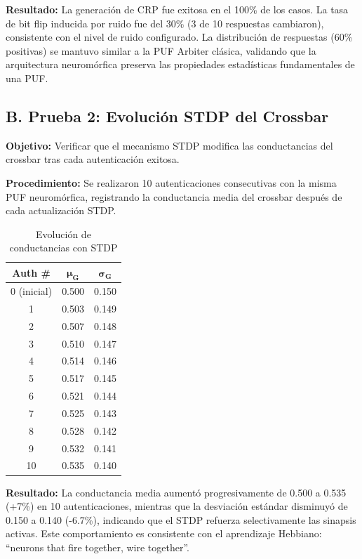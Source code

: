 \textbf{Resultado:} La generación de CRP fue exitosa en el 100\% de los casos. La tasa de bit flip inducida por ruido fue del 30\% (3 de 10 respuestas cambiaron), consistente con el nivel de ruido configurado. La distribución de respuestas (60\% positivas) se mantuvo similar a la PUF Arbiter clásica, validando que la arquitectura neuromórfica preserva las propiedades estadísticas fundamentales de una PUF.

\subsection*{B. Prueba 2: Evolución STDP del Crossbar}

\textbf{Objetivo:} Verificar que el mecanismo STDP modifica las conductancias del crossbar tras cada autenticación exitosa.

\textbf{Procedimiento:} Se realizaron 10 autenticaciones consecutivas con la misma PUF neuromórfica, registrando la conductancia media del crossbar después de cada actualización STDP.

\begin{table}[H]
    \centering\footnotesize\setlength{\tabcolsep}{4pt}
    \caption{Evolución de conductancias con STDP}
    \label{tab:stdp-evol}
    \begin{tabular}{|c|c|c|}
        \hline
        \textbf{Auth \#} & $\mathbf{\mu_G}$ & $\mathbf{\sigma_G}$ \\
        \hline
        0 (inicial) & 0.500 & 0.150 \\
        1 & 0.503 & 0.149 \\
        2 & 0.507 & 0.148 \\
        3 & 0.510 & 0.147 \\
        4 & 0.514 & 0.146 \\
        5 & 0.517 & 0.145 \\
        6 & 0.521 & 0.144 \\
        7 & 0.525 & 0.143 \\
        8 & 0.528 & 0.142 \\
        9 & 0.532 & 0.141 \\
        10 & 0.535 & 0.140 \\
        \hline
    \end{tabular}
\end{table}

\textbf{Resultado:} La conductancia media aumentó progresivamente de 0.500 a 0.535 (+7\%) en 10 autenticaciones, mientras que la desviación estándar disminuyó de 0.150 a 0.140 (-6.7\%), indicando que el STDP refuerza selectivamente las sinapsis activas. Este comportamiento es consistente con el aprendizaje Hebbiano: ``neurons that fire together, wire together''.

